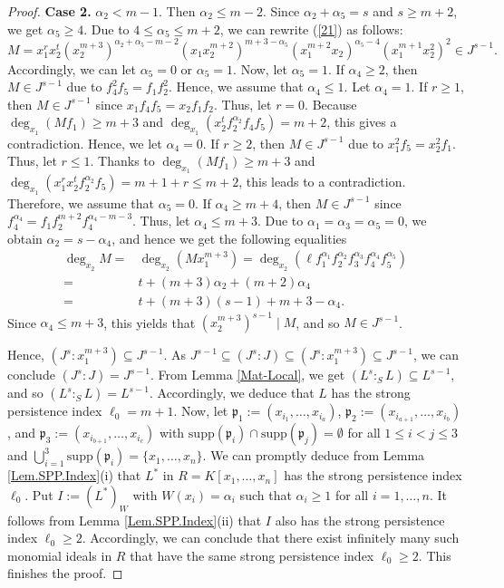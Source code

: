 \documentclass[11pt]{amsart}
\begin{document}
\begin{proof}
\textbf{Case 2.}  $\alpha_2 < m-1$.  Then $\alpha_2\leq m-2$. Since $\alpha_2+\alpha_5=s$ and $s\geq m+2$, we get  $\alpha_5\geq 4$. 
 Due to $4\leq \alpha_5 \leq m+2$, we can rewrite (\ref{21}) as follows:
     $$M= x_1^rx_2^t(x_2^{m+3})^{\alpha_2+\alpha_5-m-2} (x_1x_2^{m+2})^{m+3-\alpha_5} 
        (x_1^{m+2}x_2)^{\alpha_5-4} (x_1^{m+1}x_2^2)^{2}\in J^{s-1}.$$
     Accordingly, we can let $\alpha_5=0$ or $\alpha_5=1$. Now, let $\alpha_5= 1$. If $\alpha_4 \geq 2$, then $M\in J^{s-1}$ due to $f_4^{2}f_5=f_1f_2^{2}$. Hence, we assume that $\alpha_4 \leq 1$. Let $\alpha_4=1$. If   $r\geq 1$, then $M\in J^{s-1}$ since $x_1f_4f_5=x_2f_1f_2$. Thus, let $r=0$. Because $\deg_{x_1}(Mf_1)\geq m+3$ and   $\deg_{x_1}(x_2^t f_2^{\alpha_2} f_4f_5)=m+2$, this gives a contradiction. Hence, 
  we let $\alpha_4=0$. If $r\geq 2$, then  $M\in J^{s-1}$   due to $x_1^2f_5=x_2^2f_1$. Thus, let $r\leq 1$. Thanks to  
  $\deg_{x_1}(Mf_1)\geq m+3$ and 
  $\deg_{x_1}(x_1^rx_2^t f_2^{\alpha_2}  f_5)=m+1+r\leq m+2$, this leads to  a contradiction. 
  Therefore, we assume that $\alpha_5=0$. If $\alpha_4 \geq m+4$, then $M\in J^{s-1}$ since $f_4^{\alpha_4}=f_1f_2^{m+2}f_4^{\alpha_4-m-3}$. 
  Thus,  let $\alpha_4\leq m+3$. Due to   $\alpha_1=\alpha_3=\alpha_5=0$, we obtain  $\alpha_2=s-\alpha_4$, and hence we get the following equalities 
     \begin{align*}
  \deg_{x_2}M=&\deg_{x_2}(Mx_1^{m+3})=\deg_{x_2}(\ell f_1^{\alpha_1} f_2^{\alpha_2} f_3^{\alpha_3} f_4^{\alpha_4} f_5^{\alpha_5})\\
 =& t+(m+3)\alpha_2+(m+2)\alpha_4\\
 =& t + (m+3)(s-1) +m+3-\alpha_4.
  \end{align*}
    Since $\alpha_4\leq m+3$, this yields that $(x_2^{m+3})^{s-1} \mid M$, and so $M\in J^{s-1}$. 

Hence, $(J^s: x_1^{m+3}) \subseteq  J^{s-1}$. As $J^{s-1} \subseteq (J^s:J) \subseteq (J^s: x_1^{m+3}) \subseteq  J^{s-1}$, we can conclude   
$(J^s:J)=J^{s-1}$.  From Lemma \ref{Mat-Local}, we get   $(L^s:_SL) \subseteq L^{s-1}$, and so $(L^s:_SL)= L^{s-1}$.
     Accordingly, we deduce that $L$ has the  strong persistence index $\ell_0=m+1$.
  Now, let $\mathfrak{p}_1:=(x_{i_1}, \ldots, x_{i_a})$, $\mathfrak{p}_2:=(x_{i_{a+1}}, \ldots, x_{i_b})$, and $\mathfrak{p}_3:=(x_{i_{b+1}}, \ldots, x_{i_c})$ with  $\mathrm{supp}(\mathfrak{p}_i) \cap  \mathrm{supp}(\mathfrak{p}_j)=\emptyset$ for all $1\leq i<j \leq 3$ and $\bigcup_{i=1}^{3}\mathrm{supp}(\mathfrak{p}_i)=\{x_1, \ldots, x_n\}$. 
 We can promptly deduce from Lemma  \ref{Lem.SPP.Index}(i) that  $L^*$ in $R=K[x_1, \ldots, x_n]$
 has the strong persistence index $\ell_0$. Put   $I:=(L^*)_W$ with $W(x_i)=\alpha_i$ such that $\alpha_i \geq 1$ for all $i=1, \ldots, n$. 
 It follows from  Lemma  \ref{Lem.SPP.Index}(ii) that  $I$  also   has the strong persistence index $\ell_0\geq 2$. Accordingly, we can conclude that   there exist
  infinitely many  such monomial ideals in $R$ that have the same strong persistence  index $\ell_0\geq 2$. This finishes the proof. 
  \end{proof}
\end{document}
